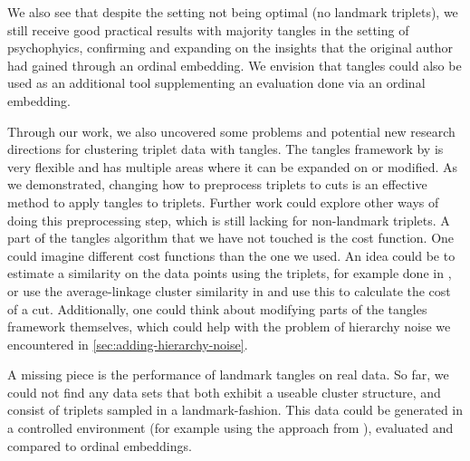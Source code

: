 We also see that despite the setting not being optimal (no landmark triplets), we still receive good practical results with majority tangles in the setting of psychophyics, 
confirming and expanding on the insights that the original author had gained through an ordinal embedding. We envision that tangles could also be used as an additional tool supplementing an evaluation done via an ordinal embedding. 

Through our work, we also uncovered some problems and potential new research directions for clustering triplet data with tangles. 
The tangles framework by \cite{klepperClusteringTanglesAlgorithmic2021} is very flexible and has multiple areas where it can be expanded on or modified. 
As we demonstrated, changing how to preprocess triplets to cuts is an effective method to apply tangles to triplets. 
Further work could explore other ways of doing this preprocessing step, which is still lacking for non-landmark triplets. 
A part of the tangles algorithm that we have not touched is the cost function. 
One could imagine different cost functions than the one we used. An idea could be to estimate a similarity on the data points using the triplets, for example done in 
\cite{kleindessnerKernelFunctionsBased2017}, or use the average-linkage cluster similarity in \cite{ghoshdastidarFoundationsComparisonBasedHierarchical2019} and use this to calculate the cost 
of a cut.
Additionally, one could think about modifying parts of the tangles framework themselves, which could help with the problem of 
hierarchy noise we encountered in \autoref{sec:adding-hierarchy-noise}.

A missing piece is the performance of landmark tangles on real data. So far, we could not find any data sets that both exhibit a useable cluster structure, and consist of triplets
sampled in a landmark-fashion. This data could be generated in a controlled environment (for example using the approach from \cite{inesschonmannSimilarityJudgementsNatural2021}), 
evaluated and compared to ordinal embeddings. 
